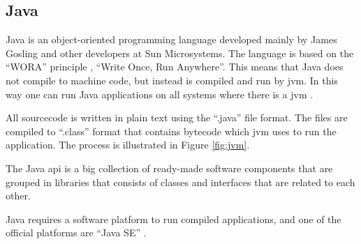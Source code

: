 \subsection{Java}

Java is an object-oriented programming language developed mainly by James Gosling and other developers at Sun Microsystems. The language is based on the ``WORA'' principle \cite{wora}, ``Write Once, Run Anywhere''. This means that Java does not compile to machine code, but instead is compiled and run by \acrfull{jvm}. In this way one can run Java applications on all systems where there is a \acrshort{jvm} \cite{java}.

All sourcecode is written in plain text using the ``.java'' file format. The files are compiled to ``.class'' format that contains bytecode which \acrshort{jvm} uses to run the application. The process is illustrated in Figure \ref{fig:jvm}.


The Java \acrfull{api} is a big collection of ready-made software components that are grouped in libraries that consists of classes and interfaces that are related to each other.

Java requires a software platform to run compiled applications, and one of the official platforms are ``Java SE'' \cite{java}.